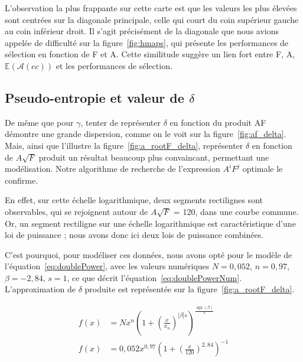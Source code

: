 	L'observation la plus frappante sur cette carte est que les valeurs les plus élevées sont centrées sur la diagonale principale, celle qui court du coin supérieur gauche au coin inférieur droit. Il s'agit précisément de la diagonale que nous avions appelée \og de difficulté \fg{} sur la figure~\ref{fig:hmaps}, qui présente les performances de sélection en fonction de F et A. Cette similitude suggère un lien fort entre F, A, $\mathbb{E}(\mathcal{A}(ec))$ et les performances de sélection.
	
	\subsection{Pseudo-entropie et valeur de \texorpdfstring{$\delta$}{delta}}
	
	De même que pour $\gamma$, tenter de représenter $\delta$ en fonction du produit AF démontre une grande dispersion, comme on le voit sur la figure~\ref{fig:af_delta}. Mais, ainsi que l'illustre la figure~\ref{fig:a_rootF_delta}, représenter $\delta$ en fonction de $A\sqrt{F}$ produit un résultat beaucoup plus convaincant, permettant une modélisation. Notre algorithme de recherche de l'expression $A^{i}F^{j}$ optimale le confirme.
	
	En effet, sur cette échelle logarithmique, deux segments rectilignes sont observables, qui se rejoignent autour de $A\sqrt{F}$ = 120, dans une courbe commune. Or, un segment rectiligne sur une échelle logarithmique est caractéristique d'une loi de puissance ; nous avons donc ici deux lois de puissance combinées.
	
	C'est pourquoi, pour modéliser ces données, nous avons opté pour le modèle de l'équation~\ref{eq:doublePower}, avec les valeurs numériques $N = 0,052$, $n = 0,97$, $\beta{} = -2,84$, $s = 1$,  ce que décrit l'équation~\ref{eq:doublePowerNum}. L'approximation de $\delta$ produite est représentée sur la figure~\ref{fig:a_rootF_delta}.
	
	\begin{align}
		\label{eq:doublePower}
		f(x) &= N x^n \left(1+\left(\frac{x}{x_n}\right)^{|\beta|s}\right)^{\frac{\operatorname{sgn}(\beta)}{s}} \\
		\label{eq:doublePowerNum}
		f(x) &= 0,052 x^{0,97} \left(1+\left(\frac{x}{120}\right)^{2,84}\right)^{-1}
	\end{align}
	
